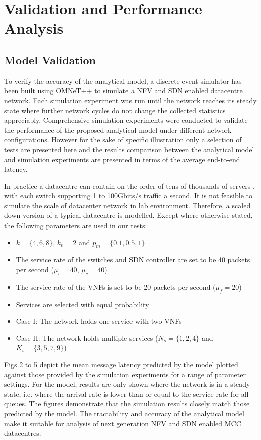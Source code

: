 \section{Validation and Performance Analysis}
\label{sec:validation}

\subsection{Model Validation}

To verify the accuracy of the analytical model, a discrete event simulator has been built using OMNeT++ \cite{VargaH08} to simulate a NFV and SDN enabled datacentre network. Each simulation experiment was run until the network reaches its steady state where further network cycles do not change the collected statistics appreciably. Comprehensive simulation experiments were conducted to validate the performance of the proposed analytical model under different network configurations. However for the sake of specific illustration only a selection of tests are presented here and the results comparison between the analytical model and simulation experiments are presented in terms of the average end-to-end latency.

In practice a datacentre can contain on the order of tens of thousands of servers \cite{AWS16}, with each switch supporting 1 to 100Gbits/s traffic a second. It is not feasible to simulate the scale of datacenter network in lab environment. Therefore, a scaled down version of a typical datacentre is modelled. Except where otherwise stated, the following parameters are used in our tests:

\begin{itemize}
	\item $k = \{4, 6, 8\}$, $k_{v} = 2$ and $p_{m} = \{0.1, 0.5, 1\}$
	\item The service rate of the switches and SDN controller are set to be 40 packets per second ($\mu_{v} = 40$, $\mu_{c} = 40$)
	\item The service rate of the VNFs is set to be 20 packets per second ($\mu_{f} = 20$)
	\item Services are selected with equal probability
	\item Case I: The network holds one service with two VNFs
	\item Case II: The network holds multiple services ($N_s = \{1,2,4\}$ and $K_i=\{3,5,7,9\}$)
\end{itemize}

Figs 2 to 5 depict the mean message latency predicted by the model plotted against those provided by the simulation experiments for a range of parameter settings. For the model, results are only shown where the network is in a steady state, i.e. where the arrival rate is lower than or equal to the service rate for all queues. The figures demonstrate that the simulation results closely match those predicted by the model. The tractability and accuracy of the analytical model make it suitable for analysis of next generation NFV and SDN enabled MCC datacentres.

